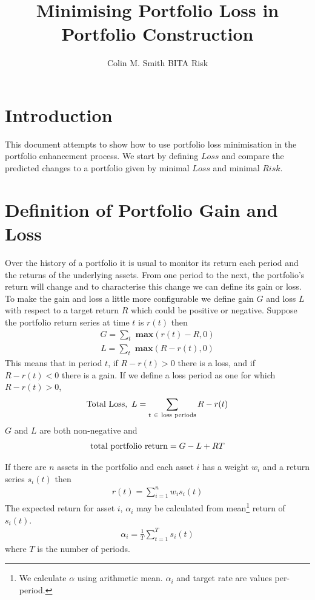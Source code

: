 \documentclass[12pt]{article}
\title{Minimising Portfolio Loss in Portfolio Construction}
\author{Colin M. Smith BITA Risk}
\begin{document}
\maketitle
\tableofcontents
\pagebreak
\doublespacing
\section{Introduction}
This document attempts to show how to use portfolio loss minimisation in the
portfolio enhancement process. We start by defining $Loss$ and compare
the predicted changes to a portfolio given by minimal $Loss$ and minimal $Risk$.
\section{Definition of Portfolio Gain and Loss}
Over the history of a portfolio it is usual to monitor its return each period and the returns of the underlying assets.
From one period  to the next, the portfolio's return will change and to characterise this change we can define its gain or loss.
To make the gain and loss a little more configurable we define 
gain $G$ and loss $L$ with respect to a target return $R$ which could be positive or negative.
Suppose the portfolio return series at time $t$ is $r(t)$ then
\begin{eqnarray}
    G = \sum_t {\textbf{ max} }(r(t) - R,0)
\end{eqnarray}
\begin{eqnarray}
    L = \sum_t {\textbf{ max} }(R-r(t),0)
\end{eqnarray}
This means that in period $t$, if $R-r(t) > 0$ there is a loss, and if $R-r(t) < 0$ there is a gain.
If we define a loss period as one for which $R-r(t) > 0$,
\begin{eqnarray}
  {\rm Total\ Loss},\ L= \sum_{t\ \in\ \rm loss\ periods} R-r(t)
\end{eqnarray}
$G$ and $L$ are both non-negative and
\begin{eqnarray}
 {\rm   total\ portfolio\ return}= G - L + RT
\end{eqnarray}

If there are $n$ assets in the portfolio and each asset $i$
has a weight $w_i$ and a return series $s_i (t)$ then
\begin{eqnarray}
    r(t) = \sum_{i=1}^{n} w_i s_i(t)
\end{eqnarray}
The expected return for asset $i$, $\alpha_i$ may be calculated from
mean\footnote{We calculate $\alpha$ using arithmetic mean. $\alpha_i$ and target rate are values per-period.} 
return of $s_i(t)$.
\begin{eqnarray}
    \alpha_i =  \frac{1}{T}\sum_{t=1}^{T} s_i(t)
\end{eqnarray}
where $T$ is the number of periods.
\end{document}
